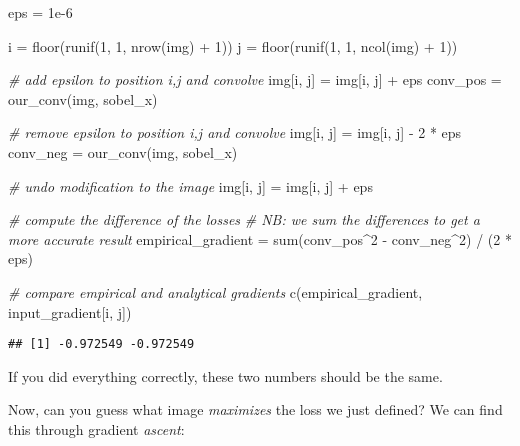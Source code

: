 \documentclass[
  a4paper,
]{article}
\newenvironment{Shaded}{\begin{snugshade}}{\end{snugshade}}
\newcommand{\CommentTok}[1]{\textcolor[rgb]{0.56,0.35,0.01}{\textit{#1}}}
\newcommand{\DecValTok}[1]{\textcolor[rgb]{0.00,0.00,0.81}{#1}}
\newcommand{\FloatTok}[1]{\textcolor[rgb]{0.00,0.00,0.81}{#1}}
\newcommand{\FunctionTok}[1]{\textcolor[rgb]{0.00,0.00,0.00}{#1}}
\newcommand{\NormalTok}[1]{#1}
\newcommand{\OtherTok}[1]{\textcolor[rgb]{0.56,0.35,0.01}{#1}}
\newcommand{\SpecialCharTok}[1]{\textcolor[rgb]{0.00,0.00,0.00}{#1}}
\begin{document}
\begin{Shaded}
\begin{Highlighting}[]
\NormalTok{eps }\OtherTok{=} \FloatTok{1e{-}6}

\NormalTok{i }\OtherTok{=} \FunctionTok{floor}\NormalTok{(}\FunctionTok{runif}\NormalTok{(}\DecValTok{1}\NormalTok{, }\DecValTok{1}\NormalTok{, }\FunctionTok{nrow}\NormalTok{(img) }\SpecialCharTok{+} \DecValTok{1}\NormalTok{))}
\NormalTok{j }\OtherTok{=} \FunctionTok{floor}\NormalTok{(}\FunctionTok{runif}\NormalTok{(}\DecValTok{1}\NormalTok{, }\DecValTok{1}\NormalTok{, }\FunctionTok{ncol}\NormalTok{(img) }\SpecialCharTok{+} \DecValTok{1}\NormalTok{))}

\CommentTok{\# add epsilon to position i,j and convolve}
\NormalTok{img[i, j] }\OtherTok{=}\NormalTok{ img[i, j] }\SpecialCharTok{+}\NormalTok{ eps}
\NormalTok{conv\_pos }\OtherTok{=} \FunctionTok{our\_conv}\NormalTok{(img, sobel\_x)}

\CommentTok{\# remove epsilon to position i,j and convolve}
\NormalTok{img[i, j] }\OtherTok{=}\NormalTok{ img[i, j] }\SpecialCharTok{{-}} \DecValTok{2} \SpecialCharTok{*}\NormalTok{ eps}
\NormalTok{conv\_neg }\OtherTok{=} \FunctionTok{our\_conv}\NormalTok{(img, sobel\_x)}

\CommentTok{\# undo modification to the image}
\NormalTok{img[i, j] }\OtherTok{=}\NormalTok{ img[i, j] }\SpecialCharTok{+}\NormalTok{ eps}

\CommentTok{\# compute the difference of the losses}
\CommentTok{\# NB: we sum the differences to get a more accurate result}
\NormalTok{empirical\_gradient }\OtherTok{=} \FunctionTok{sum}\NormalTok{(conv\_pos}\SpecialCharTok{\^{}}\DecValTok{2} \SpecialCharTok{{-}}\NormalTok{ conv\_neg}\SpecialCharTok{\^{}}\DecValTok{2}\NormalTok{) }\SpecialCharTok{/}\NormalTok{ (}\DecValTok{2} \SpecialCharTok{*}\NormalTok{ eps)}

\CommentTok{\# compare empirical and analytical gradients }
\FunctionTok{c}\NormalTok{(empirical\_gradient, input\_gradient[i, j])}
\end{Highlighting}
\end{Shaded}

\begin{verbatim}
## [1] -0.972549 -0.972549
\end{verbatim}

If you did everything correctly, these two numbers should be the same.

Now, can you guess what image \emph{maximizes} the loss we just defined?
We can find this through gradient \emph{ascent}:
\end{document}
